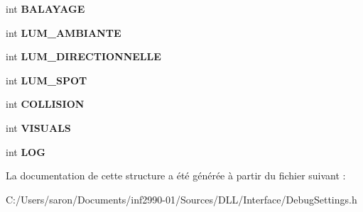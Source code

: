 \begin{DoxyCompactItemize}
\item 
\hypertarget{struct_debug_settings_a57e0ebb7811bf1d6877585fb87fb6719}{int {\bfseries B\-A\-L\-A\-Y\-A\-G\-E}}\label{struct_debug_settings_a57e0ebb7811bf1d6877585fb87fb6719}

\item 
\hypertarget{struct_debug_settings_a8bf6bc8f82dbd71e95bca1c52d719c65}{int {\bfseries L\-U\-M\-\_\-\-A\-M\-B\-I\-A\-N\-T\-E}}\label{struct_debug_settings_a8bf6bc8f82dbd71e95bca1c52d719c65}

\item 
\hypertarget{struct_debug_settings_a0b535811647b96b079ca70147c04f91c}{int {\bfseries L\-U\-M\-\_\-\-D\-I\-R\-E\-C\-T\-I\-O\-N\-N\-E\-L\-L\-E}}\label{struct_debug_settings_a0b535811647b96b079ca70147c04f91c}

\item 
\hypertarget{struct_debug_settings_a78e0a9e672944020d9e5afa05c807943}{int {\bfseries L\-U\-M\-\_\-\-S\-P\-O\-T}}\label{struct_debug_settings_a78e0a9e672944020d9e5afa05c807943}

\item 
\hypertarget{struct_debug_settings_af81b8bd5c23bc5db501815a459ed133f}{int {\bfseries C\-O\-L\-L\-I\-S\-I\-O\-N}}\label{struct_debug_settings_af81b8bd5c23bc5db501815a459ed133f}

\item 
\hypertarget{struct_debug_settings_aaa5bc236f86ae8d4cde2e688664d320f}{int {\bfseries V\-I\-S\-U\-A\-L\-S}}\label{struct_debug_settings_aaa5bc236f86ae8d4cde2e688664d320f}

\item 
\hypertarget{struct_debug_settings_a525d4e651a6c101c31739183185b1834}{int {\bfseries L\-O\-G}}\label{struct_debug_settings_a525d4e651a6c101c31739183185b1834}

\end{DoxyCompactItemize}


La documentation de cette structure a été générée à partir du fichier suivant \-:\begin{DoxyCompactItemize}
\item 
C\-:/\-Users/saron/\-Documents/inf2990-\/01/\-Sources/\-D\-L\-L/\-Interface/Debug\-Settings.\-h\end{DoxyCompactItemize}
